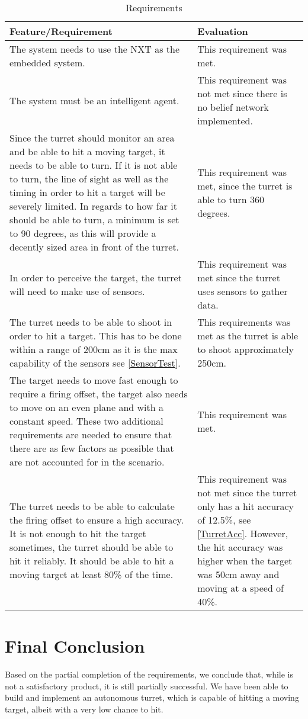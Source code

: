 \begin{table}[H]
\centering
\begin{tabular}{|p{}|p{}|}
\hline
Feature/Requirement & Evaluation\\ \hline
 The system needs to use the NXT as the embedded system. & This
 requirement was met.\\
 \hline 
 The system must be an intelligent agent. & This requirement was not met
 since there is no belief network implemented.\\ \hline
 Since the turret should monitor an area and be able to hit a moving target,
it needs to be able to turn. If it is not able to turn, the line of sight as well
as the timing in order to hit a target will be severely limited. In regards
to how far it should be able to turn, a minimum is set to 90 degrees, as
this will provide a decently sized area in front of the turret.
& This requirement was met, since the turret is able to turn 360 degrees. \\
\hline 
In order to perceive the target, the turret will need to make use of sensors.
& This requirement was met since the turret uses sensors to gather data. \\
\hline The turret needs to be able to shoot in order to hit a target. This has to
be done within a range of 200cm as it is the max capability of the sensors
see \autoref{SensorTest}.
& This requirements was met as the turret is able to shoot approximately 250cm.
\\ \hline
The target needs to move fast enough to require a firing offset, the
target also needs to move on an even plane and with a constant speed.
These two additional requirements are needed to ensure that there are as
few factors as possible that are not accounted for in the scenario.
& This requirement was met. \\ \hline
The turret needs to be able to calculate the firing offset to ensure a high
accuracy. It is not enough to hit the target sometimes, the turret should
be able to hit it reliably. It should be able to hit a moving target at least
80\% of the time.
& This requirement was not met since the turret only has a hit
accuracy of 12.5\%, see \autoref{TurretAcc}. However, the hit accuracy was
higher when the target was 50cm away and moving at a speed of 40\%.\\ \hline
\end{tabular}
\caption{Requirements}
\label{RequirementTable}
\end{table}
\section{Final Conclusion}
Based on the partial completion of the requirements, we conclude that, while
\name is not a satisfactory product, it is still partially successful. We
have been able to build and implement an autonomous turret, which is capable of
hitting a moving target, albeit with a very low chance to hit.\nl

